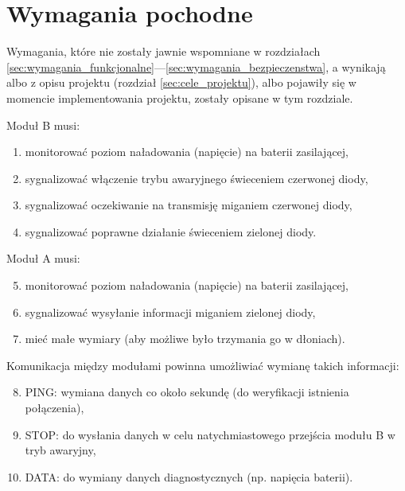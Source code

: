 
\section{Wymagania pochodne}
\label{sec:wymagania_pochodne}

Wymagania, które nie zostały jawnie wspomniane w rozdziałach \ref{sec:wymagania_funkcjonalne}—\ref{sec:wymagania_bezpieczenstwa}, a wynikają albo z opisu projektu (rozdział \ref{sec:cele_projektu}), albo pojawiły się w momencie implementowania projektu, zostały opisane w tym rozdziale.

Moduł B musi:

\begin{enumerate}
\item monitorować poziom naładowania (napięcie) na baterii zasilającej,
\item sygnalizować włączenie trybu awaryjnego świeceniem czerwonej diody,
\item sygnalizować oczekiwanie na transmisję miganiem czerwonej diody,
\item sygnalizować poprawne działanie świeceniem zielonej diody.
\end{enumerate}

Moduł A musi:

\begin{enumerate}
\setcounter{enumi}{4}
\item monitorować poziom naładowania (napięcie) na baterii zasilającej,
\item sygnalizować wysyłanie informacji miganiem zielonej diody,
\item mieć małe wymiary (aby możliwe było trzymania go w dłoniach).
\end{enumerate}

Komunikacja między modułami powinna umożliwiać wymianę takich informacji:

\begin{enumerate}
\setcounter{enumi}{7}
\item PING: wymiana danych co około sekundę (do weryfikacji istnienia połączenia),
\item STOP: do wysłania danych w celu natychmiastowego przejścia modułu B w tryb awaryjny,
\item DATA: do wymiany danych diagnostycznych (np. napięcia baterii).
\end{enumerate}



